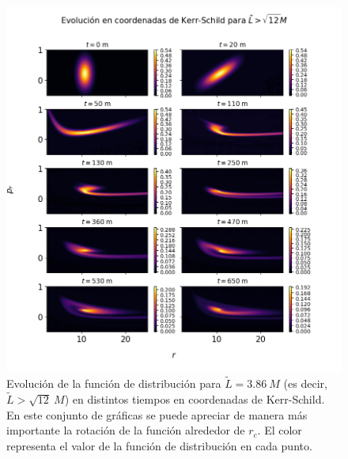 \documentclass[11pt,twoside,openright,spanish]{report}
\numberwithin{equation}{chapter}
\numberwithin{figure}{chapter}
\numberwithin{table}{chapter}
\begin{document}
\begin{table}[t]
	\centering
	\caption{Cantidades utilizadas para las simulaciones en coordenadas de Kerr-Schild, con distintos momentos angulares.}\label{datosks}
\end{table}

\newpage
\begin{figure}[H]
	\centering
	\includegraphics[width=\textwidth,height=\textheight,keepaspectratio]{graphs_study/LmayorKSGraphs/evolutionKSMayor.png}
	\caption{Evolución de la función de distribución para $\tilde{L}=3.86\ M$ (es decir, $\tilde{L}>\sqrt{12}\ M$) en distintos tiempos en coordenadas de Kerr-Schild. En este conjunto de gráficas se puede apreciar de manera más importante la rotación de la función alrededor de $r_c$. El color representa el valor de la función de distribución en cada punto.}
	\label{evolutionLmayorKS}
\end{figure}
\end{document}
